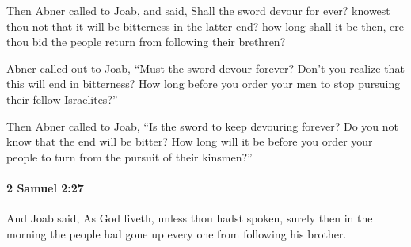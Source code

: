			\begin{versebox}
					\item[BHS] 
					\item[ASV] Then Abner called to Joab, and said, Shall the sword devour for ever? knowest thou not that it will be bitterness in the latter end? how long shall it be then, ere thou bid the people return from following their brethren?
					\item[NIV] Abner called out to Joab, “Must the sword devour forever? Don’t you realize that this will end in bitterness? How long before you order your men to stop pursuing their fellow Israelites?”
					\item[NRSV] Then Abner called to Joab, “Is the sword to keep devouring forever? Do you not know that the end will be bitter? How long will it be before you order your people to turn from the pursuit of their kinsmen?”
			\end{versebox}

		\paragraph{2 Samuel 2:27} %
			\label{2SAMUEL-2-27}

			And Joab said, As God liveth, unless thou hadst spoken, surely then in the morning the people had gone up every one from following his brother.

